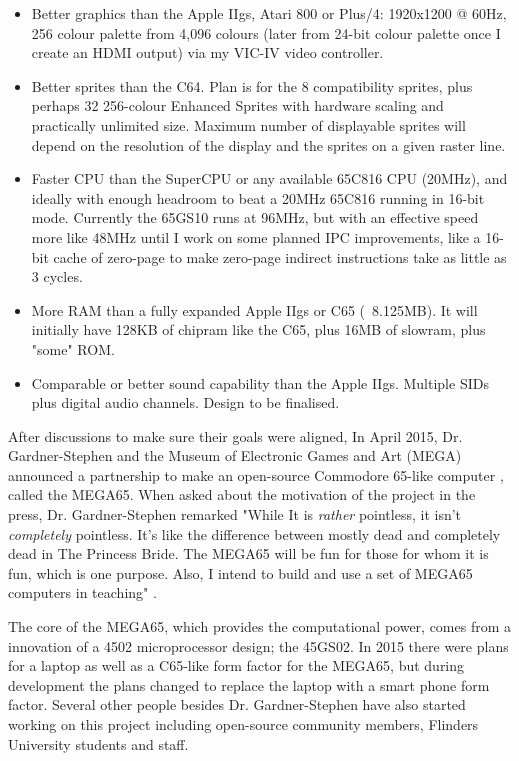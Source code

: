 \begin{itemize}[before=\itshape]
\item Better graphics than the Apple IIgs, Atari 800 or Plus/4: 1920x1200 @ 60Hz, 256 colour palette from 4,096 colours (later from 24-bit colour palette once I create an HDMI output) via my VIC-IV video controller.
 \item    Better sprites than the C64.  Plan is for the 8 compatibility sprites, plus perhaps 32 256-colour Enhanced Sprites with hardware scaling and practically unlimited size.  Maximum number of displayable sprites will depend on the resolution of the display and the sprites on a given raster line.
 \item    Faster CPU than the SuperCPU or any available 65C816 CPU (20MHz), and ideally with enough headroom to beat a 20MHz 65C816 running in 16-bit mode.  Currently the 65GS10 runs at 96MHz, but with an effective speed more like 48MHz until I work on some planned IPC improvements, like a 16-bit cache of zero-page to make zero-page indirect instructions take as little as 3 cycles.
 \item    More RAM than a fully expanded Apple IIgs or C65 (~8.125MB).  It will initially have 128KB of chipram like the C65, plus 16MB of slowram, plus "some" ROM.
 \item    Comparable or better sound capability than the Apple IIgs.  Multiple SIDs plus digital audio channels.  Design to be finalised.
 \end{itemize}  

  
After discussions to make sure their goals were aligned, In April 2015, Dr. Gardner-Stephen and the Museum of Electronic Games and Art (MEGA) announced a partnership to make an open-source Commodore 65-like computer 
\cite{RN47}, called the MEGA65. When asked about the motivation of the project in the press, Dr. Gardner-Stephen remarked "While It is \textit{rather} pointless, it isn't \textit{completely} pointless. It's like the difference between mostly dead and completely dead in The Princess Bride.  The MEGA65 will be fun for those for whom it is fun, which is one purpose.  Also, I intend to build and use a set of MEGA65 computers in teaching" 
\cite{RN48}.

The core of  the MEGA65, which provides the computational power, comes from a innovation of a 4502 microprocessor design; the 45GS02.
In 2015 there were plans for a laptop as well as a C65-like form factor for the MEGA65, but during development the plans changed to replace the laptop with a smart phone form factor. Several other people besides Dr. Gardner-Stephen have also started working on this project including open-source community members, Flinders University students and staff. 

